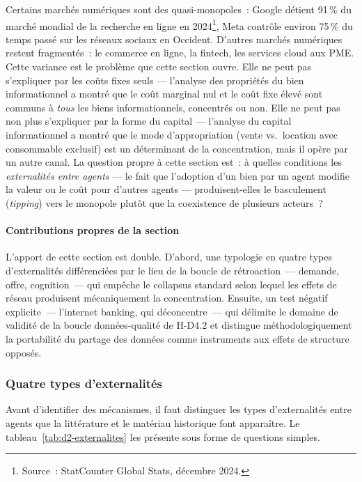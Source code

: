 Certains marchés numériques sont des quasi-monopoles~: Google détient 91\,\% du marché mondial de la recherche en ligne en 2024\footnote{Source~: StatCounter Global Stats, décembre 2024.}, Meta contrôle environ 75\,\% du temps passé sur les réseaux sociaux en Occident. D'autres marchés numériques restent fragmentés~: le commerce en ligne, la fintech, les services cloud aux PME. Cette variance est le problème que cette section ouvre. Elle ne peut pas s'expliquer par les coûts fixes seuls --- l'analyse des propriétés du bien informationnel a montré que le coût marginal nul et le coût fixe élevé sont communs à \emph{tous} les biens informationnels, concentrés ou non. Elle ne peut pas non plus s'expliquer par la forme du capital --- l'analyse du capital informationnel a montré que le mode d'appropriation (vente vs.\ location avec consommable exclusif) est un déterminant de la concentration, mais il opère par un autre canal. La question propre à cette section est~: à quelles conditions les \emph{externalités entre agents} --- le fait que l'adoption d'un bien par un agent modifie la valeur ou le coût pour d'autres agents --- produisent-elles le basculement (\emph{tipping}) vers le monopole plutôt que la coexistence de plusieurs acteurs~?

\paragraph{Contributions propres de la section}
L'apport de cette section est double. D'abord, une typologie en quatre types d'externalités différenciées par le lieu de la boucle de rétroaction~--- demande, offre, cognition~--- qui empêche le collapsus standard selon lequel les effets de réseau produisent mécaniquement la concentration. Ensuite, un test négatif explicite~--- l'internet banking, qui déconcentre~--- qui délimite le domaine de validité de la boucle données-qualité de H-D4.2 et distingue méthodologiquement la portabilité du partage des données comme instruments aux effets de structure opposés.

\subsubsection{Quatre types d'externalités}

Avant d'identifier des mécanismes, il faut distinguer les types d'externalités entre agents que la littérature et le matériau historique font apparaître. Le tableau~\ref{tab:d2-externalites} les présente sous forme de questions simples.

